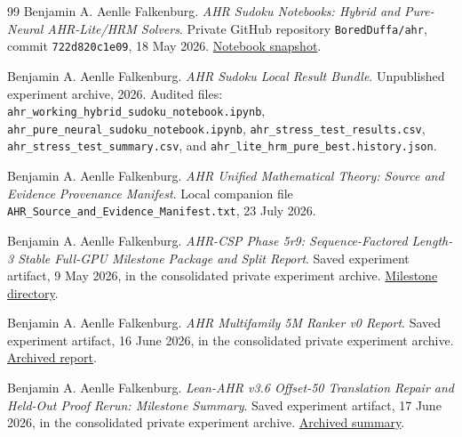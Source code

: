 \documentclass[11pt,oneside]{book}
\theoremstyle{remark}
\begin{document}
\begin{thebibliography}{99}
Benjamin A. Aenlle Falkenburg.
\newblock \emph{AHR Sudoku Notebooks: Hybrid and Pure-Neural AHR-Lite/HRM
Solvers}.
\newblock Private GitHub repository \texttt{BoredDuffa/ahr},
commit \texttt{722d820c1e09},
18 May 2026.
\newblock
\href{https://github.com/BoredDuffa/ahr/tree/722d820c1e098b0a7f85efc5735cbb5eecff3620/notebooks}
{Notebook snapshot}.

Benjamin A. Aenlle Falkenburg.
\newblock \emph{AHR Sudoku Local Result Bundle}.
\newblock Unpublished experiment archive, 2026. Audited files:
\texttt{ahr\_working\_hybrid\_sudoku\_notebook.ipynb},
\texttt{ahr\_pure\_neural\_sudoku\_notebook.ipynb},
\texttt{ahr\_stress\_test\_results.csv},
\texttt{ahr\_stress\_test\_summary.csv}, and
\texttt{ahr\_lite\_hrm\_pure\_best.history.json}.

Benjamin A. Aenlle Falkenburg.
\newblock \emph{AHR Unified Mathematical Theory: Source and Evidence
Provenance Manifest}.
\newblock Local companion file
\texttt{AHR\_Source\_and\_Evidence\_Manifest.txt}, 23 July 2026.

Benjamin A. Aenlle Falkenburg.
\newblock \emph{AHR-CSP Phase 5r9: Sequence-Factored Length-3 Stable Full-GPU
Milestone Package and Split Report}.
\newblock Saved experiment artifact, 9 May 2026, in the consolidated private
experiment archive.
\newblock
\href{https://github.com/BoredDuffa/ahr-verified-reasoning-20260509/tree/0e57d184a1189fd0abf084345bc4ecbad262f30a/plans/research_plans/ahr_csp_phase5r9_milestone_20260509}
{Milestone directory}.

Benjamin A. Aenlle Falkenburg.
\newblock \emph{AHR Multifamily 5M Ranker v0 Report}.
\newblock Saved experiment artifact, 16 June 2026, in the consolidated private
experiment archive.
\newblock
\href{https://github.com/BoredDuffa/ahr-verified-reasoning-20260509/blob/0e57d184a1189fd0abf084345bc4ecbad262f30a/reports/ahr_multifamily_5m_ranker_v0_report_20260616.json}
{Archived report}.

Benjamin A. Aenlle Falkenburg.
\newblock \emph{Lean-AHR v3.6 Offset-50 Translation Repair and Held-Out Proof
Rerun: Milestone Summary}.
\newblock Saved experiment artifact, 17 June 2026, in the consolidated private
experiment archive.
\newblock
\href{https://github.com/BoredDuffa/ahr-verified-reasoning-20260509/blob/0e57d184a1189fd0abf084345bc4ecbad262f30a/remote_tools/remote_lean_34_70_49_55_20260617/v3_6_offset50_translation_repair/MILESTONE_SUMMARY.json}
{Archived summary}.


\end{thebibliography}
\end{document}
